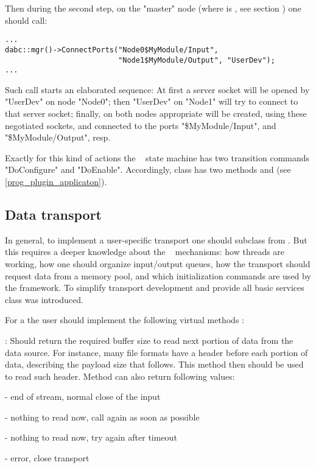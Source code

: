 Then during the second step, on the "master" node 
(where  is , 
see section )
one should call:
\begin{small}
\begin{verbatim}
...
dabc::mgr()->ConnectPorts("Node0$MyModule/Input", 
                          "Node1$MyModule/Output", "UserDev");
...
\end{verbatim}     
\end{small}
 
Such call starts an elaborated sequence: At first a server socket will be opened 
by  "UserDev" on node "Node0";
then  "UserDev" on "Node1" will try to connect to that server socket;
finally, on both nodes appropriate  
will be created, using these negotiated sockets,
and connected to the ports "\$MyModule/Input", and  "\$MyModule/Output", resp.

Exactly for this kind of actions the \dabc~ state machine has 
two transition commands "DoConfigure" and "DoEnable". Accordingly, class
 has two methods  and 
 (see \ref{prog_plugin_applicaton}).  


\subsection{Data transport}
\label{prog_plugin_device_datatransport}
In general, to implement a user-specific transport one should subclass from
. But this requires a deeper knowledge 
about the \dabc~ mechanisms:
how threads are working,
how one should organize input/output queues, how the transport should request data from a
memory pool, and which initialization commands are used by the framework. 
To simplify transport development and provide all basic services 
class  was introduced.  

For a  the
user should implement the  following virtual methods : 

\bbul
\item [\func{Read\_Size()}] : 
   Should return the required buffer size to read next portion of data from
   the data source. For instance, many file formats have a header before
   each portion of data, describing the payload size that follows. 
   This method then should be used to read such header. 
   Method can also return following values:
   \bdes
   \item[\keyw{dabc::di\_EndOfStream}] - end of stream, normal close of the input
   \item[\keyw{dabc::di\_Repeat}]      - nothing to read now, call again as soon as possible
   \item[\keyw{dabc::di\_RepeatTimeout}] - nothing to read now, try again after timeout
   \item[\keyw{dabc::di\_Error}]         - error, close transport
   \edes

